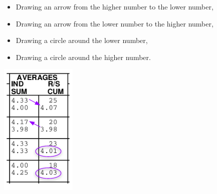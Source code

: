 \documentclass[UTF8]{article}
\begin{document}
\begin{minipage}{0.7\linewidth}
\begin{itemize}
  \item Drawing an arrow from the higher number to the lower number,
  \item Drawing an arrow from the lower number to the higher number,
  \item Drawing a circle around the lower number,
  \item Drawing a circle around the higher number.
\end{itemize}
\end{minipage}
\hfill
\begin{minipage}{0.3\linewidth}
  \includegraphics[width=0.4\linewidth]{inconsisent_annotations.png}\\
\end{minipage}



\end{document}
